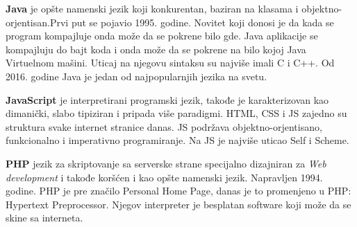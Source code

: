 \documentclass[a4paper]{article}
\begin{document}
\textbf{Java} je opšte namenski jezik koji konkurentan, baziran na klasama i objektno-orjentisan.Prvi put se pojavio 1995. godine. Novitet koji donosi je da kada se program kompajluje onda može da se pokrene bilo gde. Java aplikacije se kompajluju do bajt koda i onda može da se pokrene na bilo kojoj Java Virtuelnom mašini. Uticaj na njegovu sintaksu su najviše imali C i C++. Od 2016. godine Java je jedan od najpopularnjih jezika na svetu.

\textbf{JavaScript} je interpretirani programski jezik, takođe je karakterizovan kao dimanički, slabo tipiziran i pripada više paradigmi. HTML, CSS i JS zajedno su struktura svake internet stranice danas. JS podržava objektno-orjentisano, funkcionalno i imperativno programiranje. Na JS je najviše uticao Self i Scheme.

\textbf{PHP} jezik za skriptovanje sa serverske strane specijalno dizajniran za \emph{Web development} i takođe koršćen i kao opšte namenski jezik. Napravljen 1994. godine. PHP je pre značilo Personal Home Page, danas je to promenjeno u PHP: Hypertext Preprocessor. Njegov interpreter je besplatan software koji može da se skine sa interneta.


 
\end{document}
